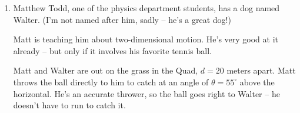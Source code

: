 \documentclass[12pt]{article}
\begin{document}
\begin{enumerate}
{\it Algebra hint:} Starting from the $x(t)$ and $v(t)$ formulae for constant acceleration, solve one equation for $t$ and substitute it back into the other one. (The algebra here is very similar to Week 2 Day 1's recitation, second problem.)

\bigskip

\item Matthew Todd, one of the physics department students, has a dog named Walter. (I'm not named after him, sadly -- he's a great dog!) 

\begin{minipage}{0.55\textwidth}Matt is teaching him about two-dimensional motion. He's very good at it already -- but only if it involves his favorite tennis ball.

\bigskip

Matt and Walter are out on the grass in the Quad, $d=20$ meters apart. Matt throws the ball directly to him to catch at an angle of $\theta=55^\circ$ above the horizontal. He's an accurate thrower, so the ball goes right to Walter -- he doesn't have to run to catch it. 


\end{minipage}
\end{enumerate}
\end{document}
